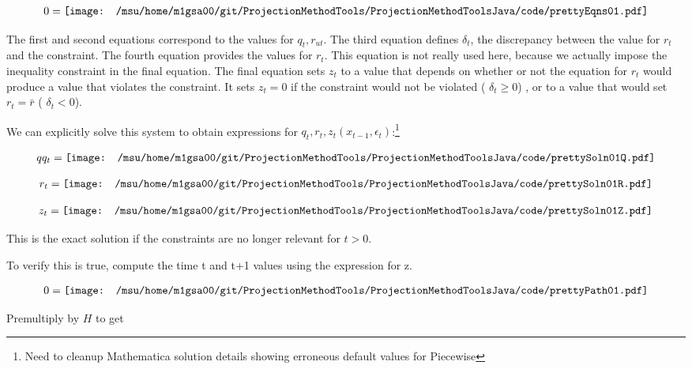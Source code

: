 \documentclass[12pt]{article}
\begin{document}
\begin{gather*}
  0=\vcenter{\hbox{\texttt{[image: /msu/home/m1gsa00/git/ProjectionMethodTools/ProjectionMethodToolsJava/code/prettyEqns01.pdf]}}}
\end{gather*}

The first and second equations correspond to the values for $q_t,r_{ut}$.
The third equation defines $\delta_t$, the discrepancy between the value for $r_t$ and the constraint.    The fourth equation provides the values for $r_t$.  This equation is not really used here, because we actually impose the inequality
constraint in the final equation. The final equation
 sets $z_t$ to a value that depends on 
whether or not the equation for $r_t$ would produce a value that violates the
constraint.  It sets $z_t=0$ if the constraint would  not be violated ( $\delta_t\ge0$) ,  or
to a value that would set $r_t=\bar{r}$ ( $\delta_t<0$).


We can explicitly solve this system to obtain  expressions for $q_t, r_t, z_{t}(x_{t-1},\epsilon_t) $:\footnote{Need to cleanup Mathematica solution details showing erroneous default values for Piecewise}

\begin{gather*}
  qq_t=\vcenter{\hbox{\texttt{[image: /msu/home/m1gsa00/git/ProjectionMethodTools/ProjectionMethodToolsJava/code/prettySoln01Q.pdf]}}}
\end{gather*}

\begin{gather*}
  r_t=\vcenter{\hbox{\texttt{[image: /msu/home/m1gsa00/git/ProjectionMethodTools/ProjectionMethodToolsJava/code/prettySoln01R.pdf]}}}
\end{gather*}

\begin{gather*}
  z_t=\vcenter{\hbox{\texttt{[image: /msu/home/m1gsa00/git/ProjectionMethodTools/ProjectionMethodToolsJava/code/prettySoln01Z.pdf]}}}
\end{gather*}

This is the exact solution if the constraints are no longer relevant for 
$t >0$.

To verify this is true, compute the time t and t+1 values using the expression for z.

\begin{gather*}
  0=\vcenter{\hbox{\texttt{[image: /msu/home/m1gsa00/git/ProjectionMethodTools/ProjectionMethodToolsJava/code/prettyPath01.pdf]}}}
\end{gather*}

Premultiply by $H$ to get
\end{document}
